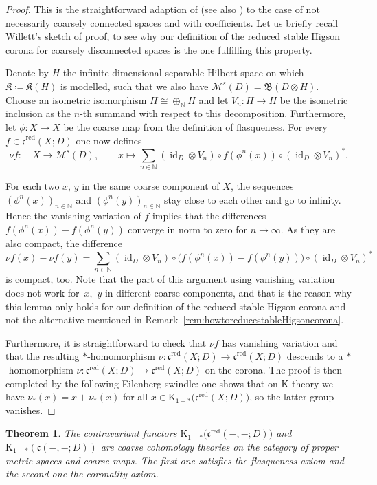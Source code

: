 \documentclass[pdftex]{sigma}
\numberwithin{equation}{section}
\newtheorem{thm}{Theorem}[section]
\theoremstyle{definition}
\newcommand{\N}{\mathbb{N}}
\DeclareMathOperator{\id}{id}
\newcommand{\K}{\mathrm{K}}
\newcommand{\sHigCor}{\mathfrak{c}}
\newcommand{\sHigComRed}{\overline{\mathfrak{c}}^{\mathrm{red}}}
\newcommand{\sHigCorRed}{\mathfrak{c}^{\mathrm{red}}}
\newcommand{\Kom}{{\mathfrak{K}}}
\newcommand{\Lin}{{\mathfrak{B}}}
\newcommand{\multiplier}{{\mathcal{M}}}
\begin{document}
\begin{proof}
This is the straightforward adaption of \cite[Proposition 3.7]{WillettHomological} (see also \cite[Theorem 5.2]{EmeMeyDualizing}) to the case of not necessarily coarsely connected spaces and with coefficients.
Let us briefly recall Willett's sketch of proof, to see why our definition of the reduced stable Higson corona for coarsely disconnected spaces is the one fulfilling this property.

Denote by $H$ the infinite dimensional separable Hilbert space on which $\Kom\coloneqq\Kom(H)$ is modelled, such that we also have $\multiplier^s(D)=\Lin(D\otimes H)$. Choose an isometric isomorphism $H\cong\oplus_\N H$ and let $V_n\colon H\to H$ be the isometric inclusion as the $n$-th summand with respect to this decomposition. Furthermore, let $\phi\colon X\to X$ be the coarse map from the definition of flasqueness. For every $f\in\sHigComRed(X;D)$ one now defines
\[
\nu f\colon\quad X\to \multiplier^s(D),\qquad x\mapsto \sum_{n\in\N}(\id_D\otimes V_n)\circ f(\phi^n(x))\circ (\id_D\otimes V_n)^*.
\]

For each two $x$, $y$ in the same coarse component of $X$, the sequences $(\phi^n(x))_{n\in\N}$ and $(\phi^n(y))_{n\in\N}$ stay close to each other and go to infinity. Hence the vanishing variation of $f$ implies that the differences $f(\phi^n(x))-f(\phi^n(y))$ converge in norm to zero for $n\to\infty$. As they are also compact, the difference
\[
\nu f(x)-\nu f(y)= \sum_{n\in\N}(\id_D\otimes V_n)\circ \big(f(\phi^n(x))-f(\phi^n(y))\big)\circ (\id_D\otimes V_n)^*
\]
is compact, too. Note that the part of this argument using vanishing variation does not work for~$x$,~$y$ in different coarse components, and that is the reason why this lemma only holds for our definition of the reduced stable Higson corona and not the alternative mentioned in Remark~\ref{rem:howtoreducestableHigsoncorona}.

Furthermore, it is straightforward to check that $\nu f$ has vanishing variation and that the resulting $*$-homomorphism $\nu\colon \sHigComRed(X;D)\to \sHigComRed(X;D)$ descends to a $*$-homomorphism $\nu\colon \sHigCorRed(X;D)\allowbreak\to \sHigCorRed(X;D)$ on the corona. The proof is then completed by the following Eilenberg swindle: one shows that on $\K$-theory we have $\nu_*(x)=x+\nu_*(x)$ for all $x\in \K_{1-*}\big(\sHigCorRed(X;D)\big)$, so the latter group vanishes.
\end{proof}

\begin{thm}%
The contravariant functors $\K_{1-*}\big(\sHigCorRed(-,-;D)\big)$ and $\K_{1-*}(\sHigCor(-,-;D))$ are co\-arse cohomology theories on the category of proper metric spaces and coarse maps. The first one satisfies the flasqueness axiom and the second one the coronality axiom.
\end{thm}
\end{document}
